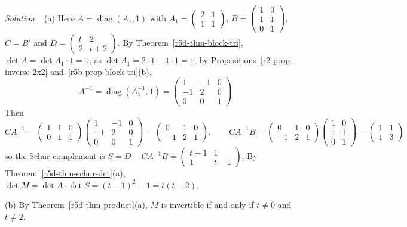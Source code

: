 \documentclass[12pt]{article}
\DeclareMathOperator{\diag}{diag}
\theoremstyle{definition}
\newenvironment{solution}{\par\noindent\textit{Solution.}\ }{\par\smallskip}
\begin{document}
\begin{solution}
(a) Here \(A=\diag(A_1,1)\) with \(A_1=\left(\begin{smallmatrix}2&1\\1&1\end{smallmatrix}\right)\),
\(B=\left(\begin{smallmatrix}1&0\\1&1\\0&1\end{smallmatrix}\right)\), \(C=B'\) and
\(D=\left(\begin{smallmatrix}t&2\\2&t+2\end{smallmatrix}\right)\). By
Theorem~\ref{r5d-thm-block-tri}, \(\det A=\det A_1\cdot1=1\), as \(\det A_1=2\cdot1-1\cdot1=1\); by
Propositions~\ref{r2-prop-inverse-2x2} and~\ref{r5b-prop-block-tri}(b),
\[
A^{-1}=\diag(A_1^{-1},1)=\begin{pmatrix}1&-1&0\\-1&2&0\\0&0&1\end{pmatrix}
\]
Then
\[
CA^{-1}=\begin{pmatrix}1&1&0\\0&1&1\end{pmatrix}\begin{pmatrix}1&-1&0\\-1&2&0\\0&0&1\end{pmatrix}=\begin{pmatrix}0&1&0\\-1&2&1\end{pmatrix},\qquad
CA^{-1}B=\begin{pmatrix}0&1&0\\-1&2&1\end{pmatrix}\begin{pmatrix}1&0\\1&1\\0&1\end{pmatrix}=\begin{pmatrix}1&1\\1&3\end{pmatrix}
\]
so the Schur complement is
\(S=D-CA^{-1}B=\left(\begin{smallmatrix}t-1&1\\1&t-1\end{smallmatrix}\right)\). By
Theorem~\ref{r5d-thm-schur-det}(a),
\(\det M=\det A\cdot\det S=(t-1)^2-1=t(t-2)\).

(b) By Theorem~\ref{r5d-thm-product}(a), \(M\) is invertible if and only if \(t\ne0\) and \(t\ne2\).


\end{solution}
\end{document}
